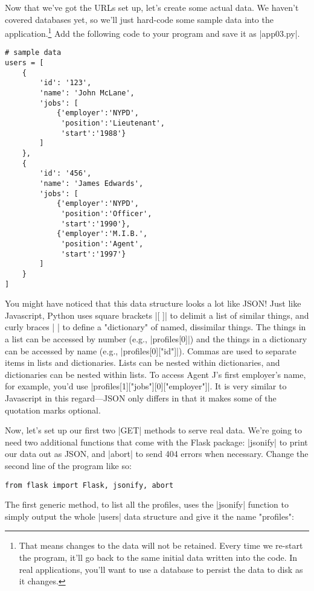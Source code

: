 \documentclass[11pt]{book}
\begin{document}
Now that we've got the URLs set up, let's create some actual data.  We haven't covered databases yet, so we'll just hard-code some sample data into the application.\footnote{That means changes to the data will not be retained.  Every time we re-start the program, it'll go back to the same initial data written into the code.  In real applications, you'll want to use a database to persist the data to disk as it changes.}  Add the following code to your program and save it as |app03.py|.

\begin{verbatim}
# sample data
users = [
    {
        'id': '123',
        'name': 'John McLane',
        'jobs': [
            {'employer':'NYPD',
             'position':'Lieutenant',
             'start':'1988'}
        ]
    },
    {
        'id': '456',
        'name': 'James Edwards',
        'jobs': [
            {'employer':'NYPD',
             'position':'Officer',
             'start':'1990'},
            {'employer':'M.I.B.',
             'position':'Agent',
             'start':'1997'}
        ]
    }
]
\end{verbatim}

You might have noticed that this data structure looks a lot like JSON!  Just like Javascript, Python uses square brackets |[ ]| to delimit a list of similar things, and curly braces |{ }| to define a "dictionary" of named, dissimilar things.  The things in a list can be accessed by number (e.g., |profiles[0]|) and the things in a dictionary can be accessed by name (e.g., |profiles[0]["id"]|).  Commas are used to separate items in lists and dictionaries.  Lists can be nested within dictionaries, and dictionaries can be nested within lists.  To access Agent J's first employer's name, for example, you'd use |profiles[1]["jobs"][0]["employer"]|.  It is very similar to Javascript in this regard---JSON only differs in that it makes some of the quotation marks optional.

Now, let's set up our first two |GET| methods to serve real data.  We're going to need two additional functions that come with the Flask package: |jsonify| to print our data out as JSON, and |abort| to send 404 errors when necessary.  Change the second line of the program like so:

\begin{verbatim}
from flask import Flask, jsonify, abort
\end{verbatim}

The first generic method, to list all the profiles, uses the |jsonify| function to simply output the whole |users| data structure and give it the name "profiles":
\end{document}
